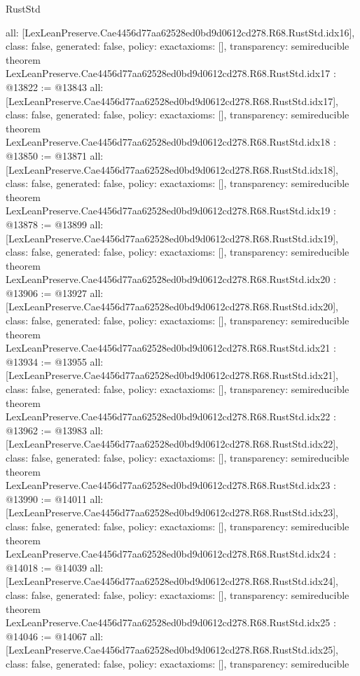 \begin{lexlean}{RustStd}
\begin{coremodule}
{  all: [LexLeanPreserve.Cae4456d77aa62528ed0bd9d0612cd278.R68.RustStd.idx16],
  class: false,
  generated: false,
  policy: exact{axioms: []},
  transparency: semireducible
}
theorem LexLeanPreserve.Cae4456d77aa62528ed0bd9d0612cd278.R68.RustStd.idx17 : @13822 := @13843 {
  all: [LexLeanPreserve.Cae4456d77aa62528ed0bd9d0612cd278.R68.RustStd.idx17],
  class: false,
  generated: false,
  policy: exact{axioms: []},
  transparency: semireducible
}
theorem LexLeanPreserve.Cae4456d77aa62528ed0bd9d0612cd278.R68.RustStd.idx18 : @13850 := @13871 {
  all: [LexLeanPreserve.Cae4456d77aa62528ed0bd9d0612cd278.R68.RustStd.idx18],
  class: false,
  generated: false,
  policy: exact{axioms: []},
  transparency: semireducible
}
theorem LexLeanPreserve.Cae4456d77aa62528ed0bd9d0612cd278.R68.RustStd.idx19 : @13878 := @13899 {
  all: [LexLeanPreserve.Cae4456d77aa62528ed0bd9d0612cd278.R68.RustStd.idx19],
  class: false,
  generated: false,
  policy: exact{axioms: []},
  transparency: semireducible
}
theorem LexLeanPreserve.Cae4456d77aa62528ed0bd9d0612cd278.R68.RustStd.idx20 : @13906 := @13927 {
  all: [LexLeanPreserve.Cae4456d77aa62528ed0bd9d0612cd278.R68.RustStd.idx20],
  class: false,
  generated: false,
  policy: exact{axioms: []},
  transparency: semireducible
}
theorem LexLeanPreserve.Cae4456d77aa62528ed0bd9d0612cd278.R68.RustStd.idx21 : @13934 := @13955 {
  all: [LexLeanPreserve.Cae4456d77aa62528ed0bd9d0612cd278.R68.RustStd.idx21],
  class: false,
  generated: false,
  policy: exact{axioms: []},
  transparency: semireducible
}
theorem LexLeanPreserve.Cae4456d77aa62528ed0bd9d0612cd278.R68.RustStd.idx22 : @13962 := @13983 {
  all: [LexLeanPreserve.Cae4456d77aa62528ed0bd9d0612cd278.R68.RustStd.idx22],
  class: false,
  generated: false,
  policy: exact{axioms: []},
  transparency: semireducible
}
theorem LexLeanPreserve.Cae4456d77aa62528ed0bd9d0612cd278.R68.RustStd.idx23 : @13990 := @14011 {
  all: [LexLeanPreserve.Cae4456d77aa62528ed0bd9d0612cd278.R68.RustStd.idx23],
  class: false,
  generated: false,
  policy: exact{axioms: []},
  transparency: semireducible
}
theorem LexLeanPreserve.Cae4456d77aa62528ed0bd9d0612cd278.R68.RustStd.idx24 : @14018 := @14039 {
  all: [LexLeanPreserve.Cae4456d77aa62528ed0bd9d0612cd278.R68.RustStd.idx24],
  class: false,
  generated: false,
  policy: exact{axioms: []},
  transparency: semireducible
}
theorem LexLeanPreserve.Cae4456d77aa62528ed0bd9d0612cd278.R68.RustStd.idx25 : @14046 := @14067 {
  all: [LexLeanPreserve.Cae4456d77aa62528ed0bd9d0612cd278.R68.RustStd.idx25],
  class: false,
  generated: false,
  policy: exact{axioms: []},
  transparency: semireducible
}
\end{coremodule}
\end{lexlean}
